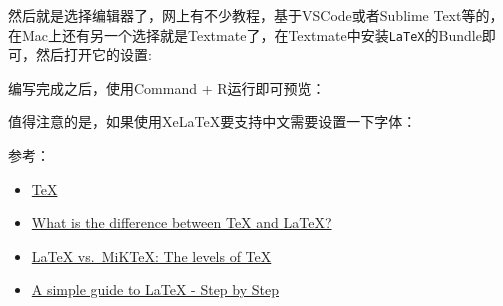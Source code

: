 \documentclass[12pt]{article}
\begin{document}
然后就是选择编辑器了，网上有不少教程，基于VSCode或者Sublime Text等的，在Mac上还有另一个选择就是Textmate了，在Textmate中安装\texttt{LaTeX}的Bundle即可，然后打开它的设置:

编写完成之后，使用Command + R运行即可预览：

值得注意的是，如果使用XeLaTeX要支持中文需要设置一下字体：

\begin{Shaded}
\begin{Highlighting}[]
\NormalTok{\{}\NormalTok{\}}
\NormalTok{\{}\NormalTok{\}}
\NormalTok{\{}\NormalTok{\}}
\NormalTok{\{}\NormalTok{\}}
\end{Highlighting}
\end{Shaded}

参考：

\begin{itemize}
\tightlist
\item
  \href{https://en.wikipedia.org/wiki/TeX\#cite_note-13}{TeX}
\item
  \href{https://tex.stackexchange.com/questions/49/what-is-the-difference-between-tex-and-latex}{What is the difference between TeX and LaTeX?}
\item
  \href{http://tug.org/levels.html}{LaTeX vs.~MiKTeX: The levels of TeX}
\item
  \href{https://www.latex-tutorial.com/tutorials/}{A simple guide to LaTeX - Step by Step}
\end{itemize}
\end{document}
